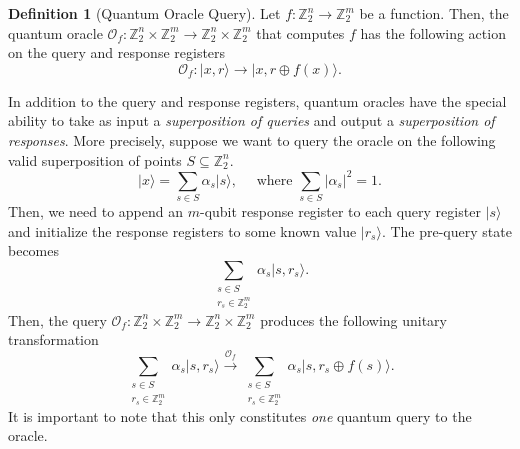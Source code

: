 \documentclass[12pt,twoside]{reedthesis}
\theoremstyle{definition}
\newtheorem{definition}[theorem]{Definition}
\newcommand{\Z}{\mathbb{Z}}
\newcommand{\ket}[1]{\ensuremath{\lvert #1\rangle}\xspace}
\begin{document}
\begin{definition}[Quantum Oracle Query] Let $f: \Z_2^n \rightarrow \Z_2^m$ be a function. Then, the quantum oracle $\mathcal{O}_f : \Z_2^n \times \Z_2^m \rightarrow \Z_2^n \times \Z_2^m$ that computes $f$ has the following action on the query and response registers 
\begin{equation*}
\mathcal{O}_f : \ket{x, r} \rightarrow \ket{x, r \oplus f(x)}.
\end{equation*}
\end{definition}
In addition to the query and response registers, quantum oracles have the special ability to take as input a \textit{superposition of queries} and output a \textit{superposition of responses}. More precisely, suppose we want to query the oracle on the following valid superposition of points $S \subseteq \Z_2^n$.
\begin{equation*}
\ket{x} = \sum_{s \in S} \alpha_s \ket{s}, \quad \text{ where } \sum_{s \in S} \lvert \alpha_s\rvert^2 = 1.
\end{equation*}
Then, we need to append an $m$-qubit response register to each query register $\ket{s}$  and initialize the response registers to some known value $\ket{r_s}$. The pre-query state becomes
\begin{equation*}
\sum_{\substack{s \in S \\ r_s \in \Z_2^m}} \alpha_s \ket{s, r_s} .
\end{equation*}
Then, the query $\mathcal{O}_f:  \Z_2^n \times \Z_2^m \rightarrow \Z_2^n \times \Z_2^m$ produces the following unitary transformation
\begin{equation*}
\sum_{\substack{s \in S \\ r_s \in \Z_2^m}} \alpha_s \ket{s, r_s}  \xrightarrow{\mathcal{O}_f} \sum_{\substack{s \in S \\ r_s \in \Z_2^m}} \alpha_s \ket{s, r_s \oplus f(s)}.
\end{equation*}
It is important to note that this only constitutes \textit{one} quantum query to the oracle.
\end{document}
